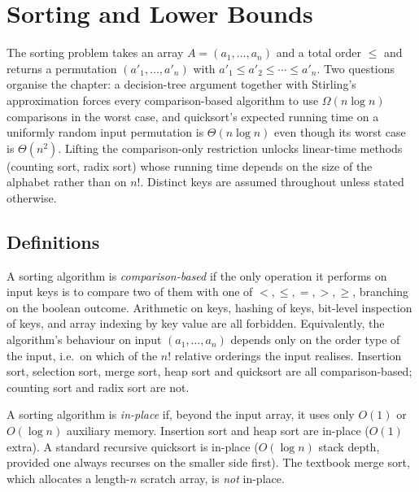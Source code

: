\section{Sorting and Lower Bounds}
\label{sec:sorting}

The sorting problem takes an array $A = (a_1, \dots, a_n)$ and a total order $\le$ and returns a permutation $(a'_1, \dots, a'_n)$ with $a'_1 \le a'_2 \le \cdots \le a'_n$. Two questions organise the chapter: a decision-tree argument together with Stirling's approximation forces every comparison-based algorithm to use $\Omega(n \log n)$ comparisons in the worst case, and quicksort's expected running time on a uniformly random input permutation is $\Theta(n \log n)$ even though its worst case is $\Theta(n^2)$. Lifting the comparison-only restriction unlocks linear-time methods (counting sort, radix sort) whose running time depends on the size of the alphabet rather than on $n!$. Distinct keys are assumed throughout unless stated otherwise.

\subsection{Definitions}

\begin{definition}
\label{def:comparison_sort}
A sorting algorithm is \emph{comparison-based} if the only operation it performs on input keys is to compare two of them with one of $<, \le, =, >, \ge$, branching on the boolean outcome. Arithmetic on keys, hashing of keys, bit-level inspection of keys, and array indexing by key value are all forbidden. Equivalently, the algorithm's behaviour on input $(a_1, \dots, a_n)$ depends only on the order type of the input, i.e.\ on which of the $n!$ relative orderings the input realises. Insertion sort, selection sort, merge sort, heap sort and quicksort are all comparison-based; counting sort and radix sort are not.
\end{definition}

\begin{definition}
\label{def:in_place}
A sorting algorithm is \emph{in-place} if, beyond the input array, it uses only $O(1)$ or $O(\log n)$ auxiliary memory. Insertion sort and heap sort are in-place ($O(1)$ extra). A standard recursive quicksort is in-place ($O(\log n)$ stack depth, provided one always recurses on the smaller side first). The textbook merge sort, which allocates a length-$n$ scratch array, is \emph{not} in-place.
\end{definition}

